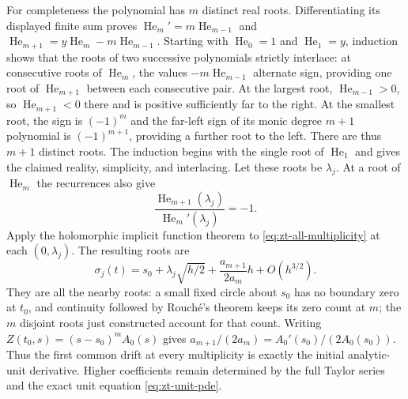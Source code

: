 For completeness the polynomial has $m$ distinct real roots.
Differentiating its displayed finite sum proves
$\operatorname{He}_m'=m\operatorname{He}_{m-1}$ and
$\operatorname{He}_{m+1}=y\operatorname{He}_m-m\operatorname{He}_{m-1}$.
Starting with $\operatorname{He}_0=1$ and
$\operatorname{He}_1=y$, induction shows that the roots of two
successive polynomials strictly interlace: at consecutive roots of
$\operatorname{He}_m$, the values
$-m\operatorname{He}_{m-1}$ alternate sign, providing one root of
$\operatorname{He}_{m+1}$ between each consecutive pair.  At the
largest root, $\operatorname{He}_{m-1}>0$, so
$\operatorname{He}_{m+1}<0$ there and is positive sufficiently far
to the right.  At the smallest root, the sign is
$(-1)^m$ and the far-left sign of its monic degree $m+1$
polynomial is $(-1)^{m+1}$, providing a further root to the left.
There are thus $m+1$ distinct roots.  The induction begins with the
single root of $\operatorname{He}_1$ and gives the claimed reality,
simplicity, and interlacing.  Let these roots be $\lambda_j$.
At a root of $\operatorname{He}_m$ the recurrences also give
\[
 \frac{\operatorname{He}_{m+1}(\lambda_j)}
      {\operatorname{He}_m'(\lambda_j)}=-1.
\]
Apply the holomorphic implicit function theorem to
\eqref{eq:zt-all-multiplicity} at each $(0,\lambda_j)$.  The resulting
roots are
\begin{equation}
 \sigma_j(t)=s_0+\lambda_j\sqrt{h/2}
                   +\frac{a_{m+1}}{2a_m}h+O(h^{3/2}).
 \label{eq:zt-general-roots}
\end{equation}
They are all the nearby roots: a small fixed circle about $s_0$
has no boundary zero at $t_0$, and continuity followed by Rouch\'e's
theorem keeps its zero count at $m$; the $m$ disjoint roots just
constructed account for that count.  Writing
$Z(t_0,s)=(s-s_0)^mA_0(s)$ gives
$a_{m+1}/(2a_m)=A_0'(s_0)/(2A_0(s_0))$.  Thus the first common
drift at every multiplicity is exactly the initial analytic-unit
derivative.  Higher coefficients remain determined by the full Taylor
series and the exact unit equation \eqref{eq:zt-unit-pde}.

